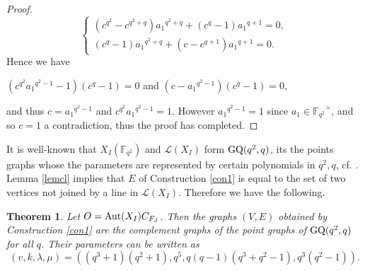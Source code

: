\documentclass[11pt]{amsart}
\newcommand{\pmat}[1]{\begin{pmatrix} #1 \end{pmatrix}}
\theoremstyle{plain} %
\newtheorem{thm}{Theorem}[section] %
\theoremstyle{definition} %
\theoremstyle{remark} %
\begin{document}
\begin{proof}
\begin{equation*}%
\begin{cases}
(c^{q^2}-c^{q^2+q}){a_1}^{q^2+q}+(c^q-1){a_1}^{q+1}=0,\\
(c^q-1){a_1}^{q^2+q}+(c-c^{q+1}){a_1}^{q+1}=0.
\end{cases}
\end{equation*}
Hence
we have
\begin{center}
$(c^{q^2}{a_1}^{q^2-1}-1)(c^q-1)=0$ and $(c-{a_1}^{q^2-1})(c^{q}-1)=0$,
\end{center}
and thus $c={a_1}^{q^2-1}$ and $c^{q^2}{a_1}^{q^2-1}=1$. However ${a_1}^{q^2-1}=1$ since $a_1\in{\mathbb{F}_{q^2}}^\times$, and so $c=1$
a contradiction, thus the proof has completed.
\end{proof}
It is well-known that $X_I(\mathbb{F}_{q^2})$ and $\mathcal{L}(X_I)$ form ${\rm GQ}(q^2,q)$, its the points graphs whose the parameters are represented by certain polynomials in $q^2,q$, cf. \cite{PT}. Lemma \ref{lemcl} implies that $E$ of Construction \ref{con1} is equal to the set of two vertices not joined by a line in $\mathcal{L}(X_I)$.
Therefore we have the following.
\begin{thm}
Let $O={\rm Aut}(X_I)C_{F_J}$. Then the graphs $(V,E)$ obtained by Construction \ref{con1} are the complement graphs of the point graphs of ${\rm GQ}(q^2,q)$ for all $q$. Their parameters can be written as
$$
(v,k,\lambda,\mu)=\left((q^3+1)(q^2+1),q^5,q(q-1)(q^3+q^2-1),q^3(q^2-1)\right).
$$
\end{thm}
\end{document}
